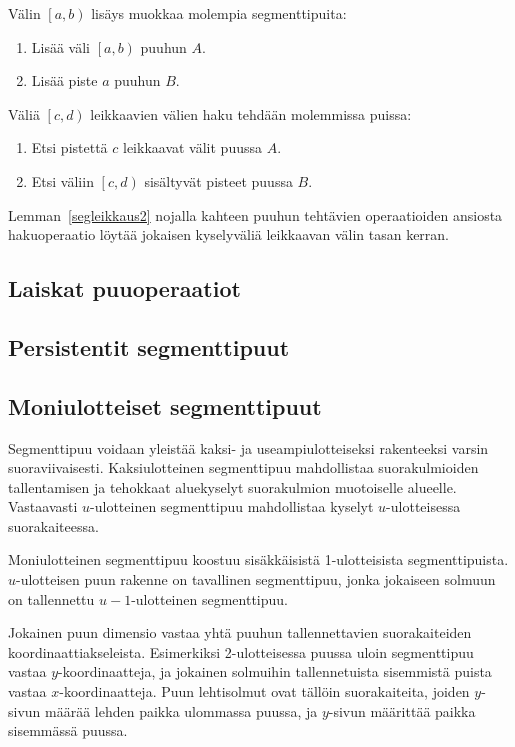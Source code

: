 \documentclass[finnish]{tktltiki2}
\theoremstyle{definition}
\theoremstyle{remark}
\newcommand\range[2]{\ensuremath{\left [ #1 , #2 \right )}\xspace}
\begin{document}
Välin $\range{a}{b}$ lisäys muokkaa molempia segmenttipuita:
\begin{enumerate}
\item Lisää väli $\range{a}{b}$ puuhun $A$.
\item Lisää piste $a$ puuhun $B$.
\end{enumerate}

Väliä $\range{c}{d}$ leikkaavien välien haku tehdään molemmissa puissa:
\begin{enumerate}
\item Etsi pistettä $c$ leikkaavat välit puussa $A$.
\item Etsi väliin $\range{c}{d}$ sisältyvät pisteet puussa $B$.
\end{enumerate}

Lemman~\ref{segleikkaus2} nojalla kahteen puuhun tehtävien operaatioiden ansiosta hakuoperaatio löytää jokaisen kyselyväliä leikkaavan välin tasan kerran.

\subsection{Laiskat puuoperaatiot}

\subsection{Persistentit segmenttipuut}

\subsection{Moniulotteiset segmenttipuut}

Segmenttipuu voidaan yleistää kaksi- ja useampiulotteiseksi rakenteeksi varsin suoraviivaisesti.
Kaksiulotteinen segmenttipuu mahdollistaa suorakulmioiden tallentamisen ja tehokkaat aluekyselyt suorakulmion muotoiselle alueelle.
Vastaavasti $u$-ulotteinen segmenttipuu mahdollistaa kyselyt $u$-ulotteisessa suorakaiteessa.

Moniulotteinen segmenttipuu koostuu sisäkkäisistä 1-ulotteisista segmenttipuista.
$u$-ulotteisen puun rakenne on tavallinen segmenttipuu, jonka jokaiseen solmuun on tallennettu $u-1$-ulotteinen segmenttipuu.

Jokainen puun dimensio vastaa yhtä puuhun tallennettavien suorakaiteiden koordinaattiakseleista.
Esimerkiksi 2-ulotteisessa puussa uloin segmenttipuu vastaa $y$-koordinaatteja, ja jokainen solmuihin tallennetuista sisemmistä puista vastaa $x$-koordinaatteja.
Puun lehtisolmut ovat tällöin suorakaiteita, joiden $y$-sivun määrää lehden paikka ulommassa puussa, ja $y$-sivun määrittää paikka sisemmässä puussa.
\end{document}
